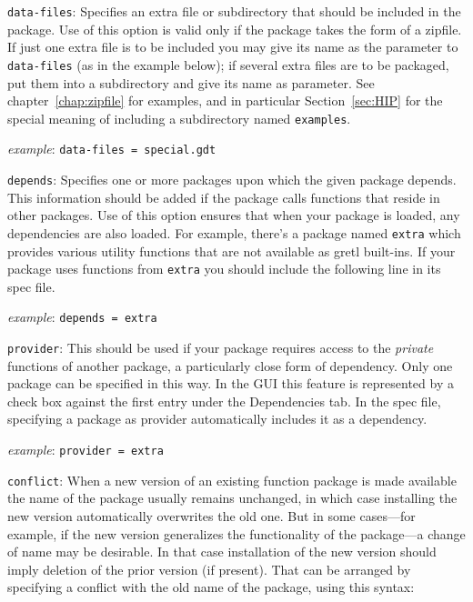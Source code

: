 \documentclass[oneside]{book}
\newcommand{\ttusage}[1]{\textit{example}: \quad \texttt{#1}}
\begin{document}
\begin{description}

\item \texttt{data-files}: Specifies an extra file or subdirectory
  that should be included in the package. Use of this option is valid
  only if the package takes the form of a zipfile. If just one extra
  file is to be included you may give its name as the parameter to
  \texttt{data-files} (as in the example below); if several extra
  files are to be packaged, put them into a subdirectory and give its
  name as parameter. See chapter~\ref{chap:zipfile} for examples, and
  in particular Section~\ref{sec:HIP} for the special meaning of
  including a subdirectory named \texttt{examples}.

  \ttusage{data-files = special.gdt}

\item \texttt{depends}: Specifies one or more packages upon which the
  given package depends. This information should be added if the
  package calls functions that reside in other packages.  Use of this
  option ensures that when your package is loaded, any dependencies
  are also loaded.  For example, there's a package named
  \texttt{extra} which provides various utility functions that are not
  available as gretl built-ins.  If your package uses functions from
  \texttt{extra} you should include the following line in its spec
  file.

  \ttusage{depends = extra}

\item \texttt{provider}: This should be used if your package requires
  access to the \textit{private} functions of another package, a
  particularly close form of dependency. Only one package can be
  specified in this way.  In the GUI this feature is represented by a
  check box against the first entry under the \textsf{Dependencies}
  tab. In the spec file, specifying a package as provider
  automatically includes it as a dependency.

  \ttusage{provider = extra}

\item \texttt{conflict}: When a new version of an existing function
  package is made available the name of the package usually remains
  unchanged, in which case installing the new version automatically
  overwrites the old one. But in some cases---for example, if the new
  version generalizes the functionality of the package---a change of
  name may be desirable. In that case installation of the new version
  should imply deletion of the prior version (if present). That can be
  arranged by specifying a conflict with the old name of the package,
  using this syntax:


\end{description}
\end{document}
